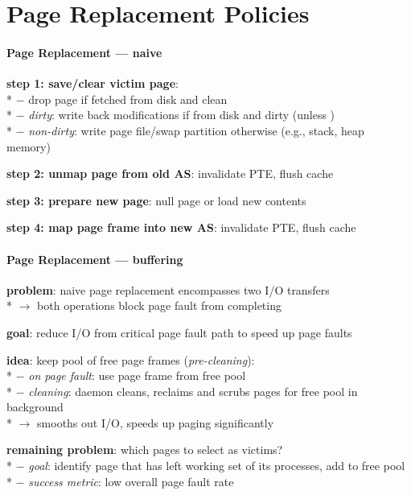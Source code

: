 \section{Page Replacement Policies}

\paragraph{Page Replacement --- naive}
\begin{items}
  \item \textbf{step 1: save/clear victim page}: \\*
    $ - $ drop page if fetched from disk and clean \\*
    $ - $ \emph{dirty}: write back modifications if from disk and dirty (unless ) \\*
    $ - $ \emph{non-dirty}: write page file/swap partition otherwise (e.g., stack, heap memory)
  \item \textbf{step 2: unmap page from old AS}: invalidate PTE, flush cache
  \item \textbf{step 3: prepare new page}: null page or load new contents
  \item \textbf{step 4: map page frame into new AS}: invalidate PTE, flush cache
\end{items}

\paragraph{Page Replacement --- buffering}
\begin{items}
  \item \textbf{problem}: naive page replacement encompasses two I/O transfers \\*
    $ \to $ both operations block page fault from completing
  \item \textbf{goal}: reduce I/O from critical page fault path to speed up page faults
  \item \textbf{idea}: keep pool of free page frames (\emph{pre-cleaning}): \\*
    $ - $ \emph{on page fault}: use page frame from free pool \\*
    $ - $ \emph{cleaning}: daemon cleans, reclaims and scrubs pages for free pool in background \\*
    $ \to $ smooths out I/O, speeds up paging significantly
  \item \textbf{remaining problem}: which pages to select as victims? \\*
    $ - $ \emph{goal}: identify page that has left working set of its processes, add to free pool \\*
    $ - $ \emph{success metric}: low overall page fault rate
\end{items}

